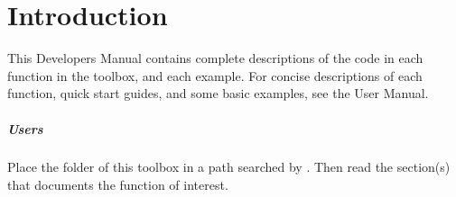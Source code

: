 \chapter{Introduction}

\begin{devMan}
This Developers Manual contains complete descriptions of the code in each function in the toolbox, and each example.  For concise descriptions of each function, quick start guides, and some basic examples, see the User Manual.
\end{devMan}


\paragraph{Users}
Place the folder of this toolbox in a path searched by \script.
Then read the section(s) that documents the function of interest.


